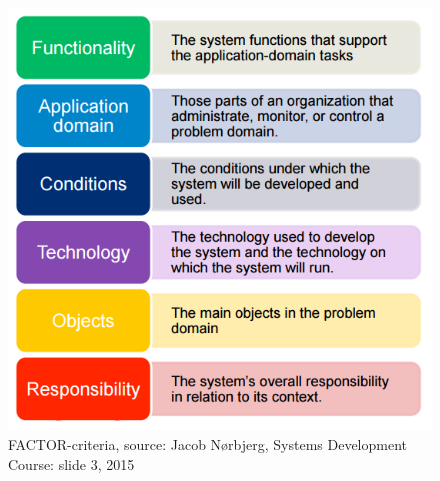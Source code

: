 \begin{figure}[H]
    \centering
    \includegraphics[scale=0.6]{Images/BATOFF.PNG}
    \caption{FACTOR-criteria, source: Jacob Nørbjerg, Systems Development Course: slide 3, 2015}
    \label{fig:FACTOR-criteria}
\end{figure}



















